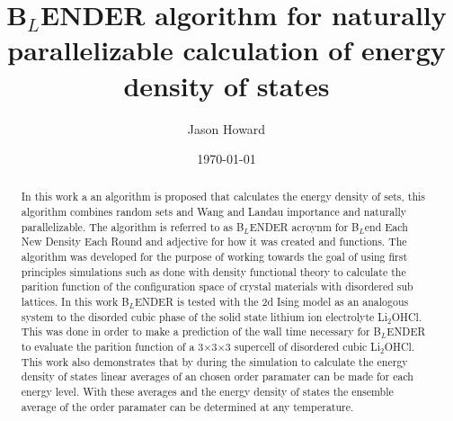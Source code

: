 \documentclass[aps,prl,reprint,superscriptaddress,showkeys]{revtex4-1}
\begin{document}
\title{B$_L$ENDER algorithm for naturally parallelizable calculation of energy density of states}

\author{Jason Howard}

\date{\today}

%


\begin{acknowledgments}
\end{acknowledgments}
\begin{abstract}
In this work a an algorithm is proposed that calculates the energy density of sets, this algorithm combines random sets and Wang and Landau importance  and  naturally parallelizable. The algorithm is referred to as B$_L$ENDER acroynm for B$_L$end Each New Density Each Round and  adjective for  how it was created and functions. The algorithm was developed for the purpose of working towards the goal of using first principles simulations such as done with density functional theory to calculate the parition function of the configuration space of crystal materials with disordered sub lattices. In this work  B$_L$ENDER  is tested with the 2d Ising model as an analogous system to the disorded cubic phase of the solid state lithium ion electrolyte Li$_2$OHCl. This was done in order to make a prediction of the  wall time necessary for B$_L$ENDER to evaluate the parition function of a 3$\times$3$\times$3 supercell of disordered cubic Li$_2$OHCl. This work also demonstrates that by during the simulation to calculate the energy density of states linear averages of an chosen order paramater can be made for each energy level. With these averages and the energy density of states the ensemble average of the order paramater can be determined at any temperature. 
\end{abstract}
\maketitle
\end{document}
